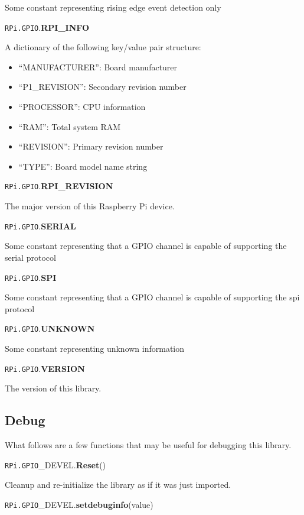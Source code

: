 \documentclass[12pt]{article}
\begin{document}
Some constant representing rising edge event detection only


\noindent \texttt{RPi.GPIO}.\textbf{RPI\_INFO}

A dictionary of the following key/value pair structure:
\begin{itemize}
    \item ``MANUFACTURER'': Board manufacturer
    \item ``P1\_REVISION'': Secondary revision number
    \item ``PROCESSOR'': CPU information
    \item ``RAM'': Total system RAM
    \item ``REVISION'': Primary revision number
    \item ``TYPE'': Board model name string
\end{itemize}


\noindent \texttt{RPi.GPIO}.\textbf{RPI\_REVISION}

The major version of this Raspberry Pi device.

\noindent \texttt{RPi.GPIO}.\textbf{SERIAL}

Some constant representing that a GPIO channel is capable of supporting the serial protocol


\noindent \texttt{RPi.GPIO}.\textbf{SPI}

Some constant representing that a GPIO channel is capable of supporting the spi protocol

\noindent \texttt{RPi.GPIO}.\textbf{UNKNOWN}

Some constant representing unknown information


\noindent \texttt{RPi.GPIO}.\textbf{VERSION}

The version of this library.

\medskip \medskip

\subsection{Debug}

What follows are a few functions that may be useful for debugging this library.

\noindent \texttt{RPi.GPIO}\_DEVEL.\textbf{Reset}()
        
Cleanup and re-initialize the library as if it was just imported.

\noindent \texttt{RPi.GPIO}\_DEVEL.\textbf{setdebuginfo}(value)
        
\end{document}
